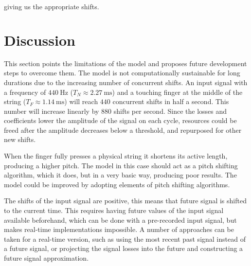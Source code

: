\documentclass{sigchi}
\begin{document}
giving us the appropriate shifts.

\section{Discussion}
This section points the limitations of the model and proposes future development steps to overcome them.
The model is not computationally sustainable for long durations due to the increasing number of concurrent shifts.
An input signal with a frequency of $\SI{440}{\hertz}$ ($T_N\approx\SI{2.27}{\milli\second}$) and a touching finger at the middle of the string ($T_F\approx\SI{1.14}{\milli\second}$) will reach $440$ concurrent shifts in half a second.
This number will increase linearly by $880$ shifts per second.
Since the losses and coefficients lower the amplitude of the signal on each cycle, resources could be freed after the amplitude decreases below a threshold, and repurposed for other new shifts.

When the finger fully presses a physical string it shortens its active length, producing a higher pitch.
The model in this case should act as a pitch shifting algorithm, which it does, but in a very basic way, producing poor results.
The model could be improved by adopting elements of pitch shifting algorithms.

The shifts of the input signal are positive, this means that future signal is shifted to the current time.
This requires having future values of the input signal available beforehand, which can be done with a pre-recorded input signal, but makes real-time implementations impossible.
A number of approaches can be taken for a real-time version, such as using the most recent past signal instead of a future signal, or projecting the signal losses into the future and constructing a future signal approximation.



\end{document}
